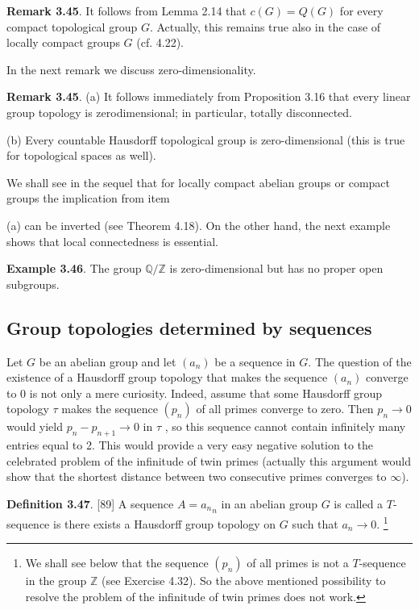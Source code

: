 \documentclass[12pt]{article}
\begin{document}
    \textbf{Remark 3.45}. It follows from Lemma 2.14 that $c(G) = Q(G)$ for every compact topological group $G$. Actually,
    this remains true also in the case of locally compact groups $G$ (cf. 4.22).
    
    
    In the next remark we discuss zero-dimensionality.    
    
    
    \textbf{Remark 3.45}. (a) It follows immediately from Proposition 3.16 that every linear group topology is zerodimensional; in particular, totally disconnected.


    (b) Every countable Hausdorff topological group is zero-dimensional (this is true for topological spaces as
    well).


    We shall see in the sequel that for locally compact abelian groups or compact groups the implication from item


    (a) can be inverted (see Theorem 4.18). On the other hand, the next example shows that local connectedness
    is essential.


    \textbf{Example 3.46}. The group $\mathbb{Q}/\mathbb{Z}$ is zero-dimensional but has no proper open subgroups.


    \subsection{Group topologies determined by sequences}


    Let $G$ be an abelian group and let $(a_n)$ be a sequence in $G$. The question of the existence of a Hausdorff group
    topology that makes the sequence $(a_n)$ converge to 0 is not only a mere curiosity. Indeed, assume that some
    Hausdorff group topology $\tau$ makes the sequence $(p_n)$ of all primes converge to zero. Then $p_n \to 0$ would yield
    $p_{n} - p_{n+1} \to 0$ in $\tau$ , so this sequence cannot contain infinitely many entries equal to 2. This would provide a
    very easy negative solution to the celebrated problem of the infinitude of twin primes (actually this argument
    would show that the shortest distance between two consecutive primes converges to $\infty$).


    \textbf{Definition 3.47}. [89] A sequence $A = {a_n}_n$ in an abelian group $G$ is called a $T$-sequence is there exists a
    Hausdorff group topology on $G$ such that $a_n \to 0.$ \footnote[2]{We shall see below that the sequence $(p_n)$ of all primes is not a $T$-sequence in the group $\mathbb{Z}$ (see Exercise 4.32). So the above
    mentioned possibility to resolve the problem of the infinitude of twin primes does not work.}
\end{document}
